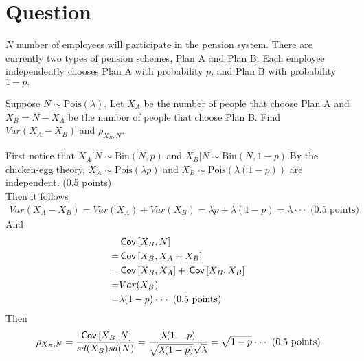 \section*{Question}
$N$ number of employees will participate in the pension system. There are currently two types of pension schemes, Plan A and Plan B. Each employee independently chooses Plan A with probability $p$, and Plan B with probability $1-p.$
\begin{exercise}[2]
 Suppose $N\sim\text{Pois}(\lambda).$ Let $X_A$ be the number of people that choose Plan A and $X_B=N-X_A$ be the number of people that choose Plan B. Find $Var(X_A-X_B)$ and $\rho_{X_B,N}.$

\begin{solution}
First notice that $X_A|N \sim \text{Bin}(N, p)$ and $X_B |N \sim \text{Bin}(N, 1-p)$.By the chicken-egg theory, $X_A\sim\text{Pois}(\lambda p)$ and $X_B \sim \text{Pois}(\lambda (1-p))$ are independent. (0.5 points) \\
Then it follows
\begin{align*}
    Var(X_A-X_B)=Var(X_A)+Var(X_B)=\lambda p+\lambda(1-p)=\lambda  \cdot \cdot \cdot \text{ (0.5 points)}
\end{align*}
And \begin{align*}
    &\,\mathsf{Cov}\left[X_B,N\right]\\
    =&\,\mathsf{Cov}\left[X_B,X_A+X_B\right]\\
    =&\,\mathsf{Cov}\left[X_B,X_A\right]+\,\mathsf{Cov}\left[X_B,X_B\right]\\
    =&Var(X_B)\\
    =&\lambda (1-p)  \cdot \cdot \cdot \text{ (0.5 points)}\\
\end{align*}
Then $$  \rho_{X_B,N}
    =\frac{\,\mathsf{Cov}\left[X_B,N\right]}{sd(X_B)sd(N)}
    =\frac{\lambda (1-p)}{\sqrt{\lambda (1-p)}\sqrt{\lambda}}
    =\sqrt{1-p}\cdot \cdot \cdot \text{ (0.5 points)}$$
\end{solution}
\end{exercise}

